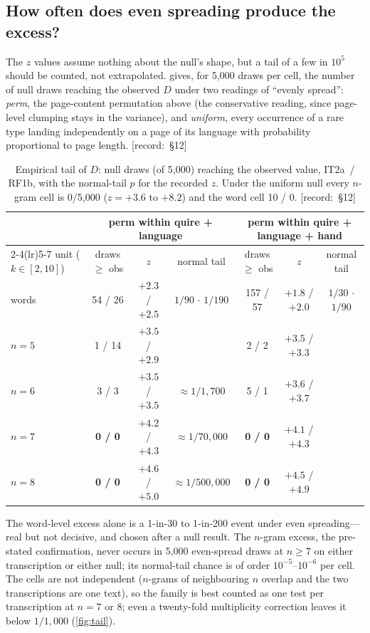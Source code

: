 \documentclass[11pt,a4paper]{article}
\newcommand{\src}[1]{{\footnotesize\color{muted}\sffamily\mbox{[record: \S#1]}}}
\newcommand{\Dstat}{D}
\newcommand{\IT}{\textcolor{it2a}{IT2a}}
\newcommand{\RF}{\textcolor{rf1b}{RF1b}}
\begin{document}
\subsection{How often does even spreading produce the excess?}
\label{sec:tail}

The $z$ values assume nothing about the null's shape, but a tail of a few in $10^{5}$ should be counted, not extrapolated.  gives, for 5,000 draws per cell, the number of null draws reaching the observed $\Dstat$ under two readings of ``evenly spread'': \emph{perm}, the page-content permutation above (the conservative reading, since page-level clumping stays in the variance), and \emph{uniform}, every occurrence of a rare type landing independently on a page of its language with probability proportional to page length. \src{12}

\begin{table}[t]
\centering\small
\caption{Empirical tail of $\Dstat$: null draws (of 5,000) reaching the observed value, \IT\ / \RF, with the normal-tail $p$ for the recorded $z$. Under the uniform null every $n$-gram cell is 0/5,000 ($z=+3.6$ to $+8.2$) and the word cell 10 / 0. \src{12}}
\label{tab:tail}
\footnotesize\setlength{\tabcolsep}{4pt}
\begin{tabular}{@{}lcccccc@{}}
\toprule
& \multicolumn{3}{c}{perm within quire + language} & \multicolumn{3}{c}{perm within quire + language + hand}\\
\cmidrule(lr){2-4}\cmidrule(lr){5-7}
unit ($k\in[2,10]$) & draws $\ge$ obs & $z$ & normal tail & draws $\ge$ obs & $z$ & normal tail\\
\midrule
words & 54 / 26 & $+2.3$ / $+2.5$ & $1/90$ $\cdot$ $1/190$ & 157 / 57 & $+1.8$ / $+2.0$ & $1/30$ $\cdot$ $1/90$\\
$n=5$ & 1 / 14 & $+3.5$ / $+2.9$ & & 2 / 2 & $+3.5$ / $+3.3$ & \\
$n=6$ & 3 / 3 & $+3.5$ / $+3.5$ & $\approx1/1,700$ & 5 / 1 & $+3.6$ / $+3.7$ & \\
$n=7$ & \textbf{0 / 0} & $+4.2$ / $+4.3$ & $\approx1/70,000$ & \textbf{0 / 0} & $+4.1$ / $+4.3$ & \\
$n=8$ & \textbf{0 / 0} & $+4.6$ / $+5.0$ & $\approx1/500,000$ & \textbf{0 / 0} & $+4.5$ / $+4.9$ & \\
\bottomrule
\end{tabular}
\end{table}

The word-level excess alone is a 1-in-30 to 1-in-200 event under even spreading---real but not decisive, and chosen after a null result. The $n$-gram excess, the pre-stated confirmation, never occurs in 5,000 even-spread draws at $n\ge7$ on either transcription or either null; its normal-tail chance is of order $10^{-5}$--$10^{-6}$ per cell. The cells are not independent ($n$-grams of neighbouring $n$ overlap and the two transcriptions are one text), so the family is best counted as one test per transcription at $n=7$ or 8; even a twenty-fold multiplicity correction leaves it below $1/1,000$ (\cref{fig:tail}).
\end{document}
